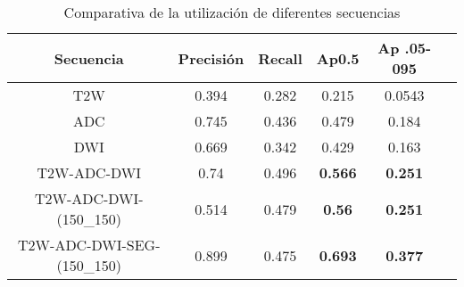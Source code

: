 \begin{table}[h]
\centering
\captionsetup{justification=centering}
\begin{tabular}{cccccc}
\toprule
\textbf{Secuencia} & \textbf{Precisión} & \textbf{Recall} & \textbf{Ap0.5} & \textbf{Ap .05-095}  \\
\midrule
T2W & 0.394 & 0.282 & 0.215 & 0.0543 \\
ADC & 0.745 & 0.436 & 0.479 & 0.184 \\
DWI & 0.669 & 0.342 & 0.429 & 0.163 \\
T2W-ADC-DWI & {0.74} & {0.496} & \textbf{0.566} & \textbf{0.251} \\
T2W-ADC-DWI-(150\_150) & {0.514} & {0.479} & \textbf{0.56} & \textbf{0.251} \\
T2W-ADC-DWI-SEG-(150\_150) & {0.899} & {0.475} & \textbf{0.693} & \textbf{0.377} \\




\bottomrule
\end{tabular}
\caption{Comparativa de la utilización de diferentes secuencias}
\label{tabla:ejemplo}
\end{table}


